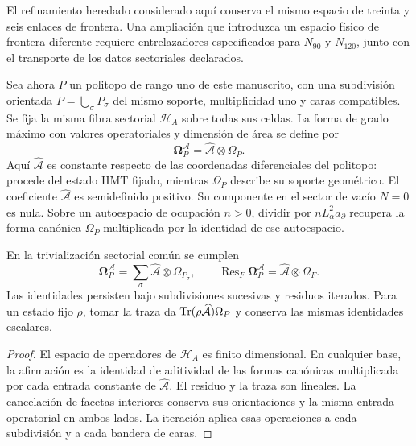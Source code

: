 El refinamiento heredado considerado aquí conserva el mismo espacio
de treinta y seis enlaces de frontera. Una ampliación que introduzca
un espacio físico de frontera diferente requiere entrelazadores
especificados para \(N_{90}\) y \(N_{120}\), junto con el
transporte de los datos sectoriales declarados.

Sea ahora \(P\) un politopo de rango uno de este manuscrito,
con una subdivisión orientada \(P=\bigcup_\sigma P_\sigma\)
del mismo soporte, multiplicidad uno y caras compatibles. Se fija
la misma fibra sectorial \(\mathscr H_A\) sobre todas sus
celdas. La forma de grado máximo con valores operatoriales y
dimensión de área se define por
\[
 \boldsymbol\Omega^{\mathcal A}_P
 =\widehat{\mathcal A}\otimes\Omega_P.
\]
Aquí \(\widehat{\mathcal A}\) es constante respecto de las
coordenadas diferenciales del politopo: procede del estado HMT
fijado, mientras \(\Omega_P\) describe su soporte geométrico.
El coeficiente \(\widehat{\mathcal A}\) es semidefinido positivo.
Su componente en el sector de vacío \(N=0\) es nula. Sobre un
autoespacio de ocupación \(n>0\), dividir por
\(nL_\alpha^2a_\partial\) recupera la forma canónica
\(\Omega_P\) multiplicada por la identidad de ese autoespacio.

\begin{proposition}
\label{rev5:forma-areal}
En la trivialización sectorial común se cumplen
\begin{equation}
 \boldsymbol\Omega^{\mathcal A}_P
 =\sum_\sigma\widehat{\mathcal A}\otimes\Omega_{P_\sigma},
 \qquad
 \operatorname{Res}_F\boldsymbol\Omega^{\mathcal A}_P
 =\widehat{\mathcal A}\otimes\Omega_F.
\end{equation}
Las identidades persisten bajo subdivisiones sucesivas y residuos
iterados. Para un estado fijo \(\rho\), tomar la traza da
\(\operatorname{Tr}(\rho\widehat{\mathcal A})\Omega_P\) y conserva
las mismas identidades escalares.
\end{proposition}
\begin{proof}
El espacio de operadores de \(\mathscr H_A\) es finito
dimensional. En cualquier base, la afirmación es la identidad de
aditividad de las formas canónicas multiplicada por cada entrada
constante de \(\widehat{\mathcal A}\). El residuo y la traza
son lineales. La cancelación de facetas interiores conserva sus
orientaciones y la misma entrada operatorial en ambos lados.
La iteración aplica esas operaciones a cada subdivisión y a cada
bandera de caras.
\end{proof}

